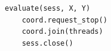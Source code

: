 \documentclass[vecarrow]{svproc}
\begin{document}
\begin{lstlisting}[language=Python,
caption={logistic regression in tensor},label={list8}]
    evaluate(sess, X, Y)
    coord.request_stop()
    coord.join(threads)
    sess.close()
\end{lstlisting}



\end{document}
